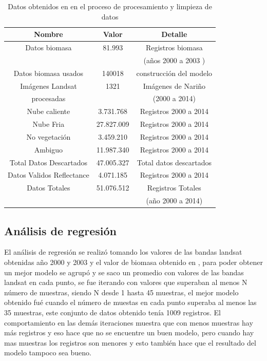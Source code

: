 \begin{table}
\caption{Datos obtenidos en en el proceso de procesamiento y limpieza  de datos}
\label{tab:datos}
\centering
\begin{tabular}{c c c}
\toprule
 Nombre & Valor& Detalle  \\
\midrule
Datos biomasa & 81.993 & Registros biomasa \\
 & & (años 2000 a 2003 \cite{baccini2008afirst})\\
Datos biomasa usados & 140018 & construcción del modelo\\
\hline
Imágenes Landsat& 1321 & Imágenes de Nariño\\
procesadas & & (2000 a 2014) \\
Nube caliente & 3.731.768 & Registros 2000 a 2014 \\
Nube Fria & 27.827.009 & Registros 2000 a 2014 \\
No vegetación & 3.459.210 & Registros 2000 a 2014 \\
Ambiguo & 11.987.340 & Registros 2000 a 2014 \\
\hline
Total Datos Descartados & 47.005.327 & Total datos descartados \\
Datos Validos Reflectance & 4.071.185 & Registros 2000 a 2014 \\
\hline
Datos Totales & 51.076.512 & Registros Totales\\
& & (año 2000 a 2014) \\
\bottomrule
\end{tabular}
\end{table}

\subsection{Análisis de regresión}

El análisis de regresión se realizó tomando los valores de las bandas landsat obtenidas año 2000 y 2003 y el valor de biomasa obtenido en \cite{baccini2008afirst},
para poder obtener un mejor modelo se agrupó y se saco un promedio con valores de las bandas landsat en cada punto, se fue iterando con  valores que superaban al menos N número de
muestras, siendo N desde 1 hasta 45 muestras, el mejor modelo obtenido fué cuando el número de muestas en cada punto superaba al menos las 35 muestras, este conjunto
de datos obtenido tenía 1009 registros. El comportamiento en las demás iteraciones muestra que con menos muestras hay más registros y eso hace que no se encuentre un buen modelo,
pero cuando hay mas muestras los registros son menores y esto también hace que el resultado del modelo tampoco sea bueno.

